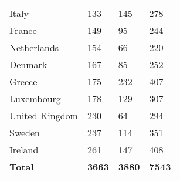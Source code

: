 \documentclass[a4paper]{article}
\begin{document}
\begin{table}[!ht]
\begin{tabular}{llll}
        Italy & 133 & 145 & 278 \\ 
        France & 149 & 95 & 244 \\ 
        Netherlands & 154 & 66 & 220 \\ 
        Denmark & 167 & 85 & 252 \\ 
        Greece & 175 & 232 & 407 \\ 
        Luxembourg & 178 & 129 & 307 \\ 
        United Kingdom & 230 & 64 & 294 \\ 
        Sweden & 237 & 114 & 351 \\ 
        Ireland & 261 & 147 & 408 \\ \hline
        \textbf{Total} & \textbf{3663} & \textbf{3880} & \textbf{7543} \\ \hline
    \end{tabular}
    \label{tab:breaks_by_country}
\end{table}
\end{document}
